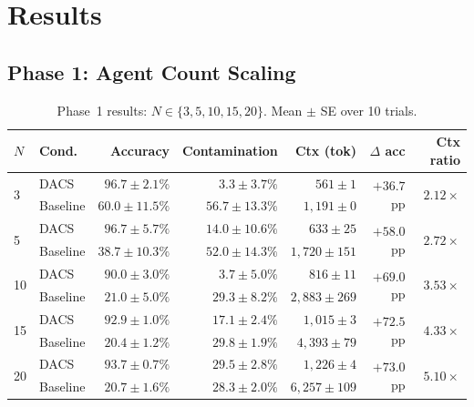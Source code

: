 \documentclass{article}
\begin{document}
\section{Results}
\label{sec:results}

\subsection{Phase 1: Agent Count Scaling}

\begin{table}[t]
\caption{Phase~1 results: $N \in \{3,5,10,15,20\}$.
Mean $\pm$ SE over 10 trials.}
\label{tab:phase1}
\centering
\small
\begin{tabular}{llrrrrr}
\toprule
$N$ & Cond. & Accuracy & Contamination & Ctx (tok) & $\Delta$ acc & Ctx ratio \\
\midrule
\multirow{2}{*}{3}
  & DACS     & $96.7\pm2.1\%$ & $3.3\pm3.7\%$  & $561\pm1$   & \multirow{2}{*}{$+36.7$pp} & \multirow{2}{*}{$2.12\times$} \\
  & Baseline & $60.0\pm11.5\%$ & $56.7\pm13.3\%$ & $1{,}191\pm0$ & & \\[4pt]
\multirow{2}{*}{5}
  & DACS     & $96.7\pm5.7\%$ & $14.0\pm10.6\%$ & $633\pm25$  & \multirow{2}{*}{$+58.0$pp} & \multirow{2}{*}{$2.72\times$} \\
  & Baseline & $38.7\pm10.3\%$ & $52.0\pm14.3\%$ & $1{,}720\pm151$ & & \\[4pt]
\multirow{2}{*}{10}
  & DACS     & $90.0\pm3.0\%$ & $3.7\pm5.0\%$  & $816\pm11$  & \multirow{2}{*}{$+69.0$pp} & \multirow{2}{*}{$3.53\times$} \\
  & Baseline & $21.0\pm5.0\%$ & $29.3\pm8.2\%$ & $2{,}883\pm269$ & & \\[4pt]
\multirow{2}{*}{15}
  & DACS     & $92.9\pm1.0\%$ & $17.1\pm2.4\%$ & $1{,}015\pm3$ & \multirow{2}{*}{$+72.5$pp} & \multirow{2}{*}{$4.33\times$} \\
  & Baseline & $20.4\pm1.2\%$ & $29.8\pm1.9\%$ & $4{,}393\pm79$ & & \\[4pt]
\multirow{2}{*}{20}
  & DACS     & $93.7\pm0.7\%$ & $29.5\pm2.8\%$ & $1{,}226\pm4$ & \multirow{2}{*}{$+73.0$pp} & \multirow{2}{*}{$5.10\times$} \\
  & Baseline & $20.7\pm1.6\%$ & $28.3\pm2.0\%$ & $6{,}257\pm109$ & & \\
\bottomrule
\end{tabular}
\end{table}
\end{document}
